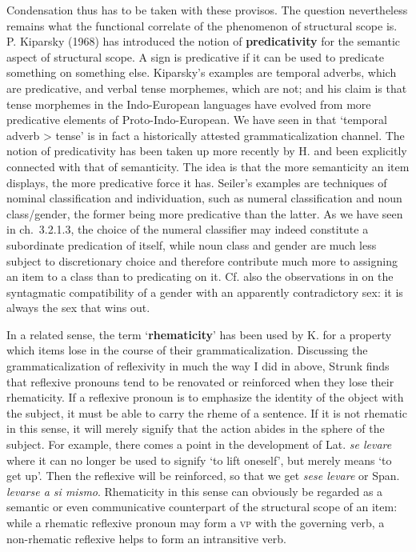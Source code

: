 Condensation thus has to be taken with these provisos. The question nevertheless remains what the functional correlate of the phenomenon of structural scope is. P. Kiparsky (1968) has introduced the notion of \textbf{predicativity} for the semantic aspect of structural scope. A sign is predicative if it can be used to predicate something on something else. Kiparsky's examples are temporal adverbs, which are predicative, and verbal tense morphemes, which are not; and his claim is that tense morphemes in the Indo-European languages have evolved from more predicative elements of Proto-Indo-European. We have seen in  that ‘temporal adverb {\textgreater} tense’ is in fact a historically attested grammaticalization channel. The notion of predicativity has been taken up more recently by H. \citet{Seiler1982} and been explicitly connected with that of semanticity. The idea is that the more semanticity an item displays, the more predicative force it has. Seiler's examples are techniques of nominal classification and individuation, such as numeral classification and noun class/gender, the former being more predicative than the latter. As we have seen in ch.~3.2.1.3, the choice of the numeral classifier may indeed constitute a subordinate predication of itself, while noun class and gender are much less subject to discretionary choice and therefore contribute much more to assigning an item to a class than to predicating on it. Cf. also the observations in  on the syntagmatic compatibility of a gender with an apparently contradictory sex: it is always the sex that wins out.

In a related sense, the term ‘\textbf{rhematicity}’ has been used by K. \citet{Strunk1980} for a property which items lose in the course of their grammaticalization. Discussing the grammaticalization of reflexivity in much the way I did in  above, Strunk finds that reflexive pronouns tend to be renovated or reinforced when they lose their rhematicity. If a reflexive pronoun is to emphasize the identity of the object with the subject, it must be able to carry the rheme of a sentence. If it is not rhematic in this sense, it will merely signify that the action abides in the sphere of the subject. For example, there comes a point in the development of Lat. \textit{se levare} where it can no longer be used to signify ‘to lift oneself’, but merely means ‘to get up’. Then the reflexive will be reinforced, so that we get \textit{sese levare} or Span. \textit{levarse a si mismo}. Rhematicity in this sense can obviously be regarded as a semantic or even communicative counterpart of the structural scope of an item: while a rhematic reflexive pronoun may form a \textsc{vp} with the governing verb, a non-rhematic reflexive helps to form an intransitive verb.

